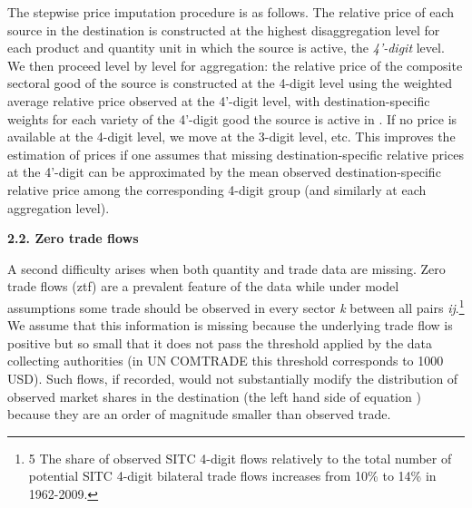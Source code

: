 \documentclass[12pt,twoside,a4paper,notitlepage]{article}
\begin{document}
The stepwise price imputation procedure is as follows. The relative price of each source in the destination is constructed at the highest disaggregation level for each product and quantity unit in which the source is active, the \textit{4'-digit} level. We then proceed level by level for aggregation: the relative price of the composite sectoral good of the source is constructed at the 4-digit level using the weighted average relative price observed at the 4'-digit level, with destination-specific weights for each variety of the 4'-digit good the source is active in%
. If no price is available at the 4-digit level, we move at the 3-digit level, etc. This improves the estimation of prices if one assumes that missing destination-specific relative prices at the 4'-digit can be approximated by the mean observed destination-specific relative price among the corresponding 4-digit group (and similarly at each aggregation level).

\textbf{2.2. Zero trade flows\label{mark-2.2.}}

A second difficulty arises when both quantity and trade data are missing. Zero trade flows (ztf) are a prevalent feature of the data while under model assumptions some trade should be observed in every sector \textit{k} between all pairs \textit{ij}.\footnote{5 The share of observed SITC 4-digit flows relatively to the total number of potential SITC 4-digit bilateral trade flows increases from 10\% to 14\% in 1962-2009.
} We assume that this information is missing because the underlying trade flow is positive but so small that it does not pass the threshold applied by the data collecting authorities (in UN COMTRADE this threshold corresponds to 1000 USD). Such flows, if recorded, would not substantially modify the distribution of observed market shares in the destination (the left hand side of equation {\hyperref[ref-002]{ }}) because they are an order of magnitude smaller than observed trade.
\end{document}
